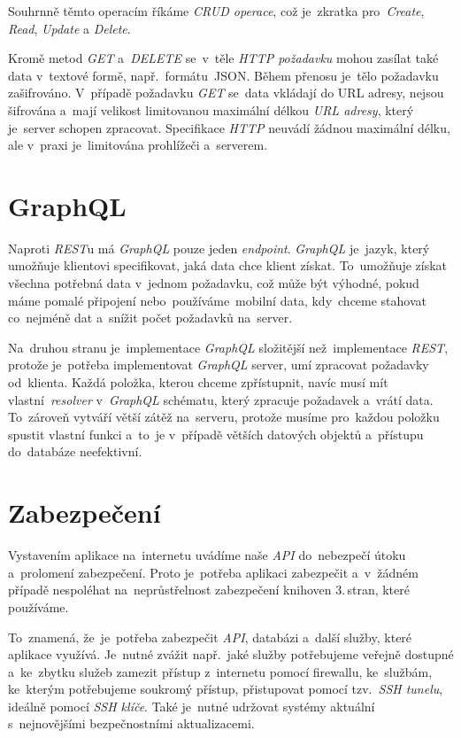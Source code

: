 \documentclass[11pt,a4paper]{report}
\begin{document}
            Souhrnně těmto operacím říkáme \emph{CRUD operace}, což je~zkratka pro~\emph{Create}, \emph{Read}, \emph{Update} a \emph{Delete}.

            Kromě metod \emph{GET} a~\emph{DELETE} se~v~těle \emph{HTTP požadavku} mohou zasílat také data v~textové formě, např.~formátu~JSON. Během přenosu je~tělo požadavku zašifrováno. V~případě požadavku \emph{GET} se~data vkládají do URL adresy, nejsou šifrována a~mají velikost limitovanou maximální délkou \emph{URL adresy}, který je~server schopen zpracovat. Specifikace \emph{HTTP} neuvádí žádnou maximální délku, ale v~praxi je~limitována prohlížeči a~serverem. \cite[3.2.1]{ietf-httpbis-messaging-03}

        \section{GraphQL}
            Naproti \emph{REST}u má \emph{GraphQL} pouze jeden \emph{endpoint}. \emph{GraphQL} je~jazyk, který umožňuje klientovi specifikovat, jaká data chce klient získat. To~umožňuje získat všechna potřebná data v~jednom požadavku, což může být výhodné, pokud máme pomalé připojení nebo~používáme~mobilní data, kdy~chceme stahovat co~nejméně dat a~snížit počet požadavků na~server.

            Na~druhou stranu je~implementace \emph{GraphQL} složitější než~implementace \emph{REST}, protože je~potřeba implementovat \emph{GraphQL} server, umí zpracovat požadavky od~klienta. Každá položka, kterou chceme zpřístupnit, navíc musí mít vlastní~\emph{resolver} v~\emph{GraphQL} schématu, který zpracuje požadavek a~vrátí data. To~zároveň vytváří větší zátěž na~serveru, protože musíme pro~každou položku spustit vlastní funkci a~to~je v~případě větších datových objektů a~přístupu do~databáze neefektivní.

        \section{Zabezpečení}
            Vystavením aplikace na~internetu uvádíme naše \emph{API} do~nebezpečí útoku a~prolomení zabezpečení. Proto je~potřeba aplikaci zabezpečit a~v~žádném případě nespoléhat na~neprůstřelnost zabezpečení knihoven 3.\,stran, které používáme.
            
            To~znamená, že~je~potřeba zabezpečit \emph{API}, databázi a~další služby, které aplikace využívá. Je~nutné zvážit např.~jaké služby potřebujeme veřejně dostupné a~ke~zbytku služeb zamezit přístup z~internetu pomocí firewallu, ke~službám, ke~kterým potřebujeme soukromý přístup, přistupovat pomocí tzv.~\emph{SSH tunelu}, ideálně pomocí \emph{SSH klíče}. Také je~nutné udržovat systémy aktuální s~nejnovějšími bezpečnostními aktualizacemi.
            
\end{document}
